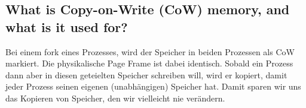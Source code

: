\subsection{\important What is Copy-on-Write (CoW) memory, and what is it used for?}
Bei einem fork eines Prozesses, wird der Speicher in beiden Prozessen als CoW markiert.
Die physikalische Page Frame ist dabei identisch.
Sobald ein Prozess dann aber in diesen geteielten Speicher schreiben will, wird er kopiert, damit jeder Prozess seinen eigenen (unabhängigen) Speicher hat.
Damit sparen wir uns das Kopieren von Speicher, den wir vielleicht nie verändern.
